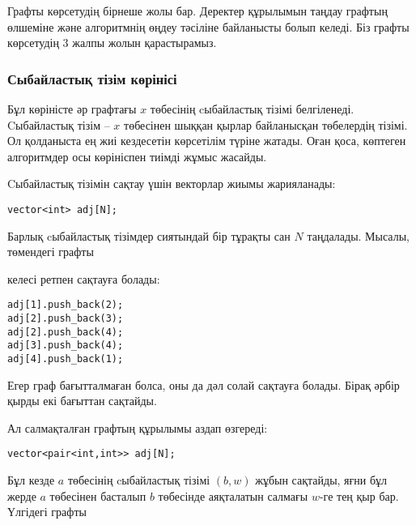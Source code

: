 Графты көрсетудің бірнеше жолы бар.
Деректер құрылымын таңдау
графтың өлшеміне және алгоритмнің өңдеу тәсіліне  байланысты болып келеді. 
Біз графты көрсетудің 3 жалпы жолын қарастырамыз.

\subsubsection{Сыбайластық тізім көрінісі}


Бұл көріністе әр графтағы $x$ төбесінің cыбайластық тізімі белгіленеді. Cыбайластық тізім -- $x$ төбесінен шыққан қырлар байланысқан төбелердің тізімі.
Ол қолданыста ең жиі кездесетін көрсетілім түріне жатады. Оған қоса, көптеген алгоритмдер осы көрініспен тиімді жұмыс жасайды.

Cыбайластық тізімін сақтау үшін векторлар жиымы жарияланады:
\begin{lstlisting}
vector<int> adj[N];
\end{lstlisting}

Барлық cыбайластық тізімдер сиятындай бір тұрақты сан $N$ таңдалады. Мысалы, төмендегі графты

\begin{center}
\end{center}
келесі ретпен сақтауға болады:
\begin{lstlisting}
adj[1].push_back(2);
adj[2].push_back(3);
adj[2].push_back(4);
adj[3].push_back(4);
adj[4].push_back(1);
\end{lstlisting}

Егер граф бағытталмаған болса, оны да дәл солай сақтауға болады. Бірақ әрбір қырды екі бағыттан сақтайды.

Ал салмақталған графтың құрылымы аздап өзгереді:

\begin{lstlisting}
vector<pair<int,int>> adj[N];
\end{lstlisting}

Бұл кезде $a$ төбесінің cыбайластық тізімі $(b,w)$ жұбын сақтайды, яғни бұл жерде $a$ төбесінен басталып $b$ төбесінде аяқталатын салмағы $w$-ге тең қыр бар. Үлгідегі графты

